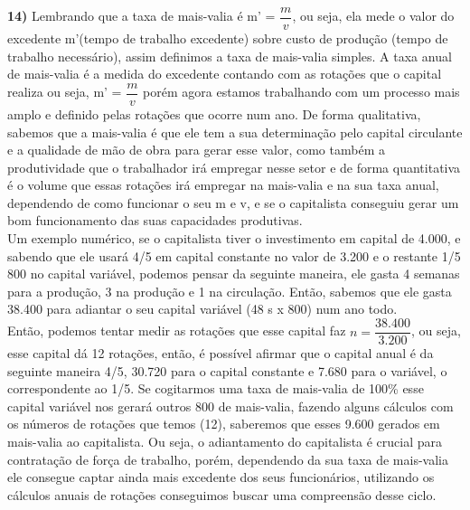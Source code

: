 \documentclass[a4paper, 12pt]{article} %
\begin{document}
\par \textbf{14)} Lembrando que a taxa de mais-valia é m' = $\dfrac{m}{v}$, ou seja, ela mede o valor do excedente m'(tempo de trabalho excedente) sobre custo de produção (tempo de trabalho necessário), assim definimos a taxa de mais-valia simples. A taxa anual de mais-valia é a medida do excedente contando com as rotações que o capital realiza ou seja, m' = $\dfrac{m}{v}$ porém agora estamos trabalhando com um processo mais amplo e definido pelas rotações que ocorre num ano. De forma qualitativa, sabemos que a mais-valia é que ele tem a sua determinação pelo capital circulante e a qualidade de mão de obra para gerar esse valor, como também a produtividade que o trabalhador irá empregar nesse setor e de forma quantitativa é o volume que essas rotações irá empregar na mais-valia e na sua taxa anual, dependendo de como funcionar o seu m e v, e se o capitalista conseguiu gerar um bom funcionamento das suas capacidades produtivas. 
\\
Um exemplo numérico, se o capitalista tiver o investimento em capital de 4.000, e sabendo que ele usará 4/5 em capital constante no valor de 3.200 e o restante 1/5 800 no capital variável, podemos pensar da seguinte maneira, ele gasta 4 semanas para a produção, 3 na produção e 1 na circulação. Então, sabemos que ele gasta 38.400 para adiantar o seu capital variável (48 s x 800) num ano todo.
\\
Então, podemos tentar medir as rotações que esse capital faz $n = \dfrac{38.400}{3.200}$, ou seja, esse capital dá 12 rotações, então, é possível afirmar que o capital anual é da seguinte maneira 4/5, 30.720 para o capital constante e 7.680 para o variável, o correspondente ao 1/5. Se cogitarmos uma taxa de mais-valia de 100\% esse capital variável nos gerará outros 800 de mais-valia, fazendo alguns cálculos com os números de rotações que temos (12), saberemos que esses 9.600 gerados em mais-valia ao capitalista. Ou seja, o adiantamento do capitalista é crucial para contratação de força de trabalho, porém, dependendo da sua taxa de mais-valia ele consegue captar ainda mais excedente dos seus funcionários, utilizando os cálculos anuais de rotações conseguimos buscar uma compreensão desse ciclo.
\end{document}
